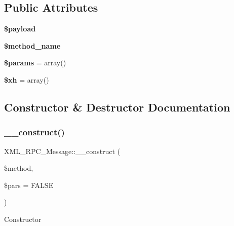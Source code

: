 \subsection*{Public Attributes}
\begin{DoxyCompactItemize}
\item 
\mbox{\label{class_x_m_l___r_p_c___message_a575c2d4959a6d542e83c9bbe0e3a8af3}} 
{\bfseries \$payload}
\item 
\mbox{\label{class_x_m_l___r_p_c___message_afa6df5dea609d886fef581c8a4328668}} 
{\bfseries \$method\+\_\+name}
\item 
\mbox{\label{class_x_m_l___r_p_c___message_accddb6dcf57b5c5f1d3142a6529b0f64}} 
{\bfseries \$params} = array()
\item 
\mbox{\label{class_x_m_l___r_p_c___message_a562e19e793a9da6dc22238c109698c6d}} 
{\bfseries \$xh} = array()
\end{DoxyCompactItemize}


\subsection{Constructor \& Destructor Documentation}
\mbox{\label{class_x_m_l___r_p_c___message_ae3c3f62b3cd527a0c1fb4d45790fd825}} 
\subsubsection{\texorpdfstring{\+\_\+\+\_\+construct()}{\_\_construct()}}
{\footnotesize\ttfamily X\+M\+L\+\_\+\+R\+P\+C\+\_\+\+Message\+::\+\_\+\+\_\+construct (\begin{DoxyParamCaption}\item[{}]{\$method,  }\item[{}]{\$pars = {\ttfamily FALSE} }\end{DoxyParamCaption})}

Constructor


